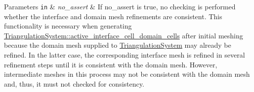 \begin{DoxyParams}[1]{Parameters}
\mbox{\tt in}  & {\em no\+\_\+assert} & If {\ttfamily no\+\_\+assert} is {\ttfamily true}, no checking is performed whether the interface and domain mesh refinements are consistent. This functionality is necessary when generating {\ttfamily \hyperlink{class_triangulation_system_a516c7a253cefbc5e208714538b21424d}{Triangulation\+System\+::active\+\_\+interface\+\_\+cell\+\_\+domain\+\_\+cells}} after initial meshing because the domain mesh supplied to \hyperlink{class_triangulation_system}{Triangulation\+System} may already be refined. In the latter case, the corresponding interface mesh is refined in several refinement steps until it is consistent with the domain mesh. However, intermediate meshes in this process may not be consistent with the domain mesh and, thus, it must not checked for consistency. \\
\hline
\end{DoxyParams}
